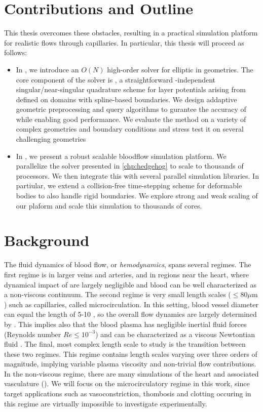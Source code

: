 \section{Contributions and Outline}
This thesis overcomes these obstacles, resulting in a practical simulation platform for realistic \rbc flows through capillaries.
In particular, this thesis will proceed as follows:
\begin{itemize}
    \item In , we introduce an $O(N)$ high-order solver for elliptic \pdes in \threed geometries.
        The core component of the solver is \qbkix, a straightforward \pde-independent singular/near-singular quadrature scheme for layer potentials arising from \pdes defined on domains with spline-based boundaries.
        We design addaptive geometric preprocessing and query algorithms to gurantee the accuracy of \qbkix while enabling good performance. 
        We evaluate the method on a variety of complex geometries and boundary conditions and stress test it on several challenging geometries
    \item In , we present a robust scalable bloodflow simulation platform. 
        We parallelize the \pde solver presented in \cref{chp:hedgehog} to scale to thousands of processors.
        We then integrate this with several parallel \rbc simulation libraries. 
        In partiular, we extend a collision-free time-stepping scheme for deformable bodies to also handle rigid boundaries.
        We explore strong and weak scaling of our plaform and scale this simulation to thousands of cores.
\end{itemize}

\section{Background}
The fluid dynamics of blood flow, or \textit{hemodynamics}, spans several regimes. 
The first regime is in larger veins and arteries, and in regions near the heart, where dynamical impact of \rbcs are largely negligible and blood can be well characterized as a non-viscous continuum. 
The second regime is very small length scales ($\leq 80 \mu$m ) such as capillaries, called microcirculation.
In this setting, blood vessel diameter can equal the length of 5-10 \rbcs {}, so the overall flow dynamics are largely determined by \rbcs. 
 This implies also that the blood plasma has negligible inertial fluid forces (Reynolds number $Re \leq 10^{-3}$) and can be characterized as a viscous Newtontian fluid \cite{cortinovis2006capillary}.
The final, most complex length scale to study is the transition between these two regimes.%
This regime contains length scales varying over three orders of magnitude, implying variable plasma viscosity and non-trivial \rbc flow contributions.
In the non-viscous regime, there are many simulations of the heart and associated vasculature ().
We will focus on the microcirculatory regime in this work, since target applications such as vasoconstriction, thombosis and clotting occuring in this regime are virtually impossible to investigate experimentally.


